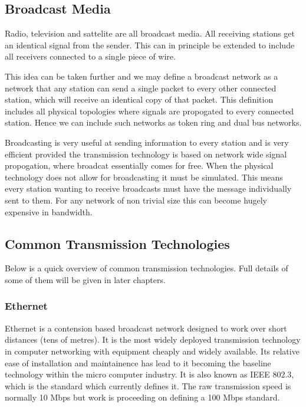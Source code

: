 \subsection{Broadcast Media}

Radio, television and sattelite are all broadcast media.  All
receiving stations get an identical signal from the sender.  This can
in principle be extended to include all receivers connected to a
single piece of wire.

This idea can be taken further and we may define a broadcast network
as a network that any station can send a single packet to every other
connected station, which will receive an identical copy of that
packet.  This definition includes all physical topologies where
signals are propogated to every connected station.  Hence we can
include such networks as token ring and dual bus networks.

Broadcasting is very useful at sending information to every station
and is very efficient provided the transmission technology is based on
network wide signal propogation, where broadcat essentially comes for
free.  When the physical technology does not allow for broadcasting it
must be simulated.  This means every station wanting to receive
broadcasts must have the message individually sent to them.  For any
network of non trivial size this can become hugely expensive in
bandwidth.

\subsection{Common Transmission Technologies}

Below is a quick overview of common transmission technologies.  Full
details of some of them will be given in later chapters.

\subsubsection{Ethernet}

Ethernet is a contension based broadcast network designed to work over
short distances (tens of metres).  It is the most widely deployed
transmission technology in computer networking with equipment cheaply
and widely available.  Its relative ease of installation and
maintainence has lead to it becoming the baseline technology within
the micro computer industry.  It is also known as IEEE 802.3, which is
the standard which currently defines it.  The raw transmission speed is
normally 10 Mbps but work is proceeding on defining a 100 Mbps
standard.

